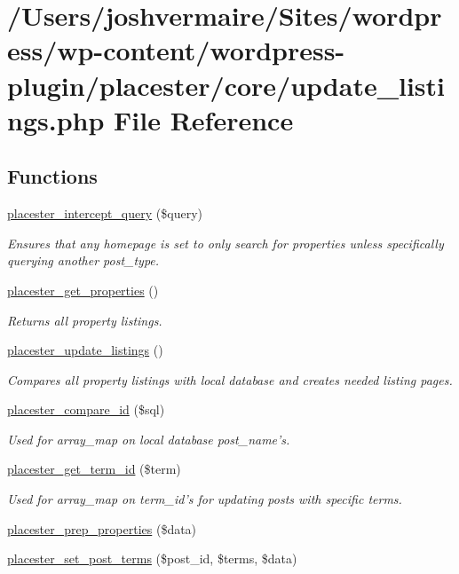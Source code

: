 \hypertarget{update__listings_8php}{
\section{/Users/joshvermaire/Sites/wordpress/wp-\/content/wordpress-\/plugin/placester/core/update\_\-listings.php File Reference}
\label{df/d03/update__listings_8php}
}
\subsection*{Functions}
\begin{DoxyCompactItemize}
\item 
\hyperlink{update__listings_8php_a4c9f023f090a0be1fbe2decd0fba35d0}{placester\_\-intercept\_\-query} (\$query)
\begin{DoxyCompactList}\small\item\em Ensures that any homepage is set to only search for properties unless specifically querying another post\_\-type. \end{DoxyCompactList}\item 
\hyperlink{update__listings_8php_a21435b525e7f9616b2a596a2560233c1}{placester\_\-get\_\-properties} ()
\begin{DoxyCompactList}\small\item\em Returns all property listings. \end{DoxyCompactList}\item 
\hyperlink{update__listings_8php_a9bd1eb219ffc1341592daea59cfbf666}{placester\_\-update\_\-listings} ()
\begin{DoxyCompactList}\small\item\em Compares all property listings with local database and creates needed listing pages. \end{DoxyCompactList}\item 
\hyperlink{update__listings_8php_a80775621e8881820df5d6d9675a2d5f8}{placester\_\-compare\_\-id} (\$sql)
\begin{DoxyCompactList}\small\item\em Used for array\_\-map on local database post\_\-name's. \end{DoxyCompactList}\item 
\hyperlink{update__listings_8php_ab5735fd93ba041dac2dd4198e4921527}{placester\_\-get\_\-term\_\-id} (\$term)
\begin{DoxyCompactList}\small\item\em Used for array\_\-map on term\_\-id's for updating posts with specific terms. \end{DoxyCompactList}\item 
\hyperlink{update__listings_8php_a8beac0e3eaf48e155b0233591d8a8c15}{placester\_\-prep\_\-properties} (\$data)
\item 
\hyperlink{update__listings_8php_a3fc34a255705ac47093221bcc0be706f}{placester\_\-set\_\-post\_\-terms} (\$post\_\-id, \$terms, \$data)
\end{DoxyCompactItemize}


